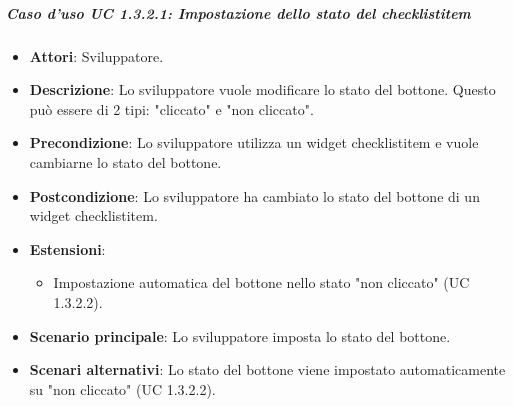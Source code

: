 \subparagraph{Caso d'uso UC 1.3.2.1: Impostazione dello stato del checklistitem}
\label{UC 1.3.2.1: Impostare lo stato del bottone}
\FloatBarrier
\begin{itemize}
\item\textbf{Attori}: Sviluppatore.
\item\textbf{Descrizione}: Lo sviluppatore vuole modificare lo stato del bottone. Questo può essere di 2 tipi: "cliccato" e "non cliccato".
\item\textbf{Precondizione}: Lo sviluppatore utilizza un widget checklistitem e vuole cambiarne lo stato del bottone.
\item\textbf{Postcondizione}: Lo sviluppatore ha cambiato lo stato del bottone di un widget checklistitem.
\item\textbf{Estensioni}: 
\begin{itemize}
\item Impostazione automatica del bottone nello stato "non cliccato" (UC 1.3.2.2).
\end{itemize}
\item\textbf{Scenario principale}: Lo sviluppatore imposta lo stato del bottone.
\item\textbf{Scenari alternativi}: Lo stato del bottone viene impostato automaticamente su "non cliccato" (UC 1.3.2.2).
\end{itemize}
